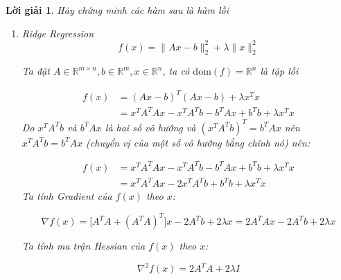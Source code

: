\documentclass[14pt, a4paper]{article}
\theoremstyle{sltheorem}
\theoremstyle{soltheorem}
\newtheorem*{loigiai}{Lời giải}
\begin{document}
    \begin{loigiai}

        Hãy chứng minh các hàm sau là hàm lồi
        \begin{enumerate} [wide, labelwidth=!, labelindent=0pt,label=\textbf{\arabic*}.]
            \item Ridge Regression
            \begin{equation*}
                f(x)=\lVert Ax - b \rVert_2^2 + \lambda \lVert x \rVert_2^2
            \end{equation*}

            Ta đặt $A \in \mathbb{R}^{m \times n}, b \in \mathbb{R}^{m}, x \in \mathbb{R}^{n}$, ta có $\mathrm{dom}(f)=\mathbb{R}^{n}$ là tập lồi

            \begin{equation*}
                \begin{aligned}
                    f(x) &= (Ax - b)^T (Ax - b) + \lambda x^T x \\
                    &=x^T A^T A x - x^TA^Tb - b^T Ax + b^T b + \lambda x^T x
                \end{aligned}
            \end{equation*}
            Do $x^TA^Tb$ và $b^TAx$ là hai số vô hướng và $(x^TA^Tb)^T=b^TAx$ nên $x^TA^Tb=b^TAx$ (chuyển vị của một số vô hướng bằng chính nó) nên:

            \begin{equation*}
                \begin{aligned}
                    f(x) &= x^T A^T A x - x^TA^Tb - b^T Ax + b^T b + \lambda x^T x\\
                    &=x^T A^T A x-2x^TA^Tb+b^Tb + \lambda x^T x
                \end{aligned}
            \end{equation*}
            Ta tính Gradient của $f(x)$ theo $x$:

            \begin{equation*}
                \nabla f(x) =\Big\lbrack A^TA + (A^TA)^T \Big\rbrack x - 2A^Tb + 2\lambda x = 2A^T A x - 2 A^T b + 2\lambda x
            \end{equation*}

            Ta tính ma trận Hessian của $f(x)$ theo $x$:

            \begin{equation*}
                \nabla^2 f(x) = 2A^T A + 2 \lambda I
            \end{equation*}


\end{enumerate}
\end{loigiai}
\end{document}
